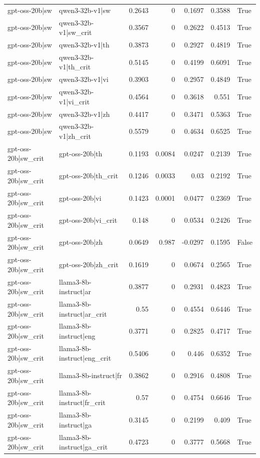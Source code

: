 \begin{table}
\begin{tabular}{l l r r r r l}
gpt-oss-20b|sw & qwen3-32b-v1|sw & 0.2643 & 0 & 0.1697 & 0.3588 & True \\
gpt-oss-20b|sw & qwen3-32b-v1|sw_crit & 0.3567 & 0 & 0.2622 & 0.4513 & True \\
gpt-oss-20b|sw & qwen3-32b-v1|th & 0.3873 & 0 & 0.2927 & 0.4819 & True \\
gpt-oss-20b|sw & qwen3-32b-v1|th_crit & 0.5145 & 0 & 0.4199 & 0.6091 & True \\
gpt-oss-20b|sw & qwen3-32b-v1|vi & 0.3903 & 0 & 0.2957 & 0.4849 & True \\
gpt-oss-20b|sw & qwen3-32b-v1|vi_crit & 0.4564 & 0 & 0.3618 & 0.551 & True \\
gpt-oss-20b|sw & qwen3-32b-v1|zh & 0.4417 & 0 & 0.3471 & 0.5363 & True \\
gpt-oss-20b|sw & qwen3-32b-v1|zh_crit & 0.5579 & 0 & 0.4634 & 0.6525 & True \\
gpt-oss-20b|sw_crit & gpt-oss-20b|th & 0.1193 & 0.0084 & 0.0247 & 0.2139 & True \\
gpt-oss-20b|sw_crit & gpt-oss-20b|th_crit & 0.1246 & 0.0033 & 0.03 & 0.2192 & True \\
gpt-oss-20b|sw_crit & gpt-oss-20b|vi & 0.1423 & 0.0001 & 0.0477 & 0.2369 & True \\
gpt-oss-20b|sw_crit & gpt-oss-20b|vi_crit & 0.148 & 0 & 0.0534 & 0.2426 & True \\
gpt-oss-20b|sw_crit & gpt-oss-20b|zh & 0.0649 & 0.987 & -0.0297 & 0.1595 & False \\
gpt-oss-20b|sw_crit & gpt-oss-20b|zh_crit & 0.1619 & 0 & 0.0674 & 0.2565 & True \\
gpt-oss-20b|sw_crit & llama3-8b-instruct|ar & 0.3877 & 0 & 0.2931 & 0.4823 & True \\
gpt-oss-20b|sw_crit & llama3-8b-instruct|ar_crit & 0.55 & 0 & 0.4554 & 0.6446 & True \\
gpt-oss-20b|sw_crit & llama3-8b-instruct|eng & 0.3771 & 0 & 0.2825 & 0.4717 & True \\
gpt-oss-20b|sw_crit & llama3-8b-instruct|eng_crit & 0.5406 & 0 & 0.446 & 0.6352 & True \\
gpt-oss-20b|sw_crit & llama3-8b-instruct|fr & 0.3862 & 0 & 0.2916 & 0.4808 & True \\
gpt-oss-20b|sw_crit & llama3-8b-instruct|fr_crit & 0.57 & 0 & 0.4754 & 0.6646 & True \\
gpt-oss-20b|sw_crit & llama3-8b-instruct|ga & 0.3145 & 0 & 0.2199 & 0.409 & True \\
gpt-oss-20b|sw_crit & llama3-8b-instruct|ga_crit & 0.4723 & 0 & 0.3777 & 0.5668 & True \\

\end{tabular}
\end{table}
